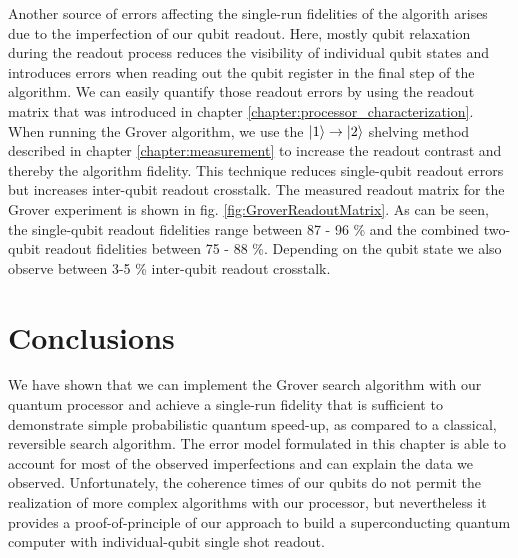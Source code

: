 Another source of errors affecting the single-run fidelities of the algorith arises due to the imperfection of our qubit readout. Here, mostly qubit relaxation during the readout process reduces the visibility of individual qubit states and introduces errors when reading out the qubit register in the final step of the algorithm. We can easily quantify those readout errors by using the readout matrix that was introduced in chapter \ref{chapter:processor_characterization}. When running the Grover algorithm, we use the $\left| 1 \right>\to\left| 2 \right>$ shelving method described in chapter \ref{chapter:measurement} to increase the readout contrast and thereby the algorithm fidelity. This technique reduces single-qubit readout errors but increases inter-qubit readout crosstalk. The measured readout matrix for the Grover experiment is shown in fig. \ref{fig:GroverReadoutMatrix}. As can be seen, the single-qubit readout fidelities range between 87 - 96 \% and the combined two-qubit readout fidelities between 75 - 88 \%. Depending on the qubit state we also observe between 3-5 \% inter-qubit readout crosstalk.

\section{Conclusions}

We have shown that we can implement the Grover search algorithm with our quantum processor and achieve a single-run fidelity that is sufficient to demonstrate simple probabilistic quantum speed-up, as compared to a classical, reversible search algorithm. The error model formulated in this chapter is able to account for most of the observed imperfections and can explain the data we observed. Unfortunately, the coherence times of our qubits do not permit the realization of more complex algorithms with our processor, but nevertheless it provides a proof-of-principle of our approach to build a superconducting quantum computer with individual-qubit single shot readout.
